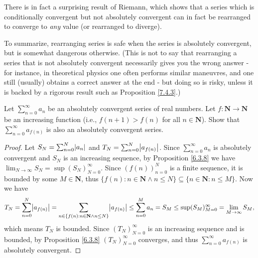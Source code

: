 \begin{note}
There is in fact a surprising result of Riemann, which shows that a series which is conditionally convergent but not absolutely convergent can in fact be rearranged to converge to \emph{any} value
(or rearranged to diverge).
\end{note}

\begin{note}
To summarize, rearranging series is safe when the series is absolutely convergent, but is somewhat dangerous otherwise.
(This is not to say that rearranging a series that is not absolutely convergent necessarily gives you the wrong answer
- for instance, in theoretical physics one often performs similar maneuvres, and one still (usually) obtains a correct answer at the end
- but doing so is risky, unless it is backed by a rigorous result such as Proposition \ref{7.4.3}.)
\end{note}

\exercisesection

\begin{exercise}\label{ex 7.4.1}
Let \(\sum_{n = 0}^\infty a_n\) be an absolutely convergent series of real numbers.
Let \(f : \mathbf{N} \to \mathbf{N}\) be an increasing function (i.e., \(f(n + 1) > f(n)\) for all \(n \in \mathbf{N}\)).
Show that \(\sum_{n = 0}^\infty a_{f(n)}\) is also an absolutely convergent series.
\end{exercise}

\begin{proof}
Let \(S_N = \sum_{n = 0}^N \abs*{a_n}\) and \(T_N = \sum_{n = 0}^N \abs*{a_{f(n)}}\).
Since \(\sum_{n = 0}^\infty a_n\) is absolutely convergent and \(S_N\) is an increasing sequence, by Proposition \ref{6.3.8} we have \(\lim_{N \to \infty} S_N = \sup(S_N)_{N = 0}^\infty\).
Since \((f(n))_{n = 0}^N\) is a finite sequence, it is bounded by some \(M \in \mathbf{N}\), thus \(\{f(n) : n \in \mathbf{N} \land n \leq N\} \subseteq \{n \in \mathbf{N} : n \leq M\}\).
Now we have
\[
    T_N = \sum_{n = 0}^N \abs*{a_{f(n)}} = \sum_{n \in \{f(n) : n \in \mathbf{N} \land n \leq N\}} \abs*{a_{f(n)}} \leq \sum_{n = 0}^M a_n = S_M \leq \sup(S_M)_{M = 0}^\infty = \lim_{M \to \infty} S_M,
\]
which means \(T_N\) is bounded.
Since \((T_N)_{N = 0}^\infty\) is an increasing sequence and is bounded, by Proposition \ref{6.3.8} \((T_N)_{N = 0}^\infty\) converges, and thus \(\sum_{n = 0}^\infty a_{f(n)}\) is absolutely convergent.
\end{proof}